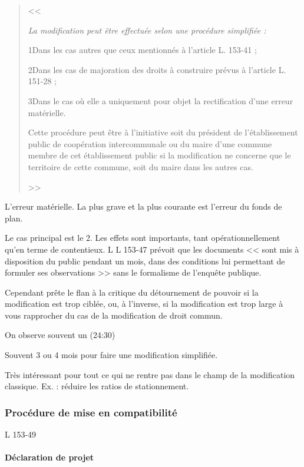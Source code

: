 		 		\begin{quote}
		 			<< {\itshape
		 				La modification peut être effectuée selon une procédure simplifiée :

		 				1\degres Dans les cas autres que ceux mentionnés à l'article L. 153-41 ;

		 				2\degres Dans les cas de majoration des droits à construire prévus à l'article L. 151-28 ;

		 				3\degres Dans le cas où elle a uniquement pour objet la rectification d'une erreur matérielle.

		 				Cette procédure peut être à l'initiative soit du président de l'établissement public de coopération intercommunale ou du maire d'une commune membre de cet établissement public si la modification ne concerne que le territoire de cette commune, soit du maire dans les autres cas.
		 			} >>
		 		\end{quote}

			 	L'erreur matérielle. La plus grave et la plus courante est l'erreur du fonds de plan.

			 	Le cas principal est le 2\ieme{}. Les effets sont importants, tant opérationnellement qu'en terme de contentieux. L  L 153-47 prévoit que les documents << sont mis à disposition du public pendant un mois, dans des conditions lui permettant de formuler ses observations >> sans le formalisme de l'enquête publique.

			 	Cependant prête le flan à la critique du détournement de pouvoir si la modification est trop ciblée, ou, à l'inverse, si la modification est trop large à vous rapprocher du cas de la modification de droit commun.

			 	On observe souvent un (24:30)

			 	Souvent 3 ou 4 mois pour faire une modification simplifiée.

			 	Très intéressant pour tout ce qui ne rentre pas dans le champ de la modification classique. Ex. : réduire les ratios de stationnement.

		 	\subsubsection{Procédure de mise en compatibilité} L 153-49

		 		\paragraph{Déclaration de projet}

